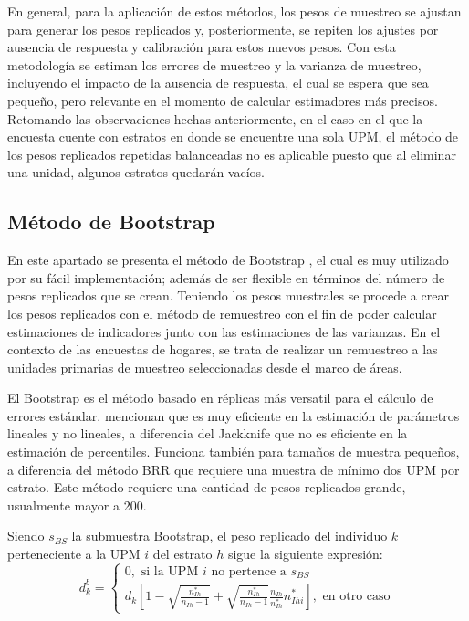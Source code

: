 \documentclass[
  12pt,
]{book}
\begin{document}
En general, para la aplicación de estos métodos, los pesos de muestreo se ajustan para generar los pesos replicados y, posteriormente, se repiten los ajustes por ausencia de respuesta y calibración para estos nuevos pesos. Con esta metodología se estiman los errores de muestreo y la varianza de muestreo, incluyendo el impacto de la ausencia de respuesta, el cual se espera que sea pequeño, pero relevante en el momento de calcular estimadores más precisos. Retomando las observaciones hechas anteriormente, en el caso en el que la encuesta cuente con estratos en donde se encuentre una sola UPM, el método de los pesos replicados repetidas balanceadas no es aplicable puesto que al eliminar una unidad, algunos estratos quedarán vacíos.

\hypertarget{muxe9todo-de-bootstrap}{%
\subsection{Método de Bootstrap}\label{muxe9todo-de-bootstrap}}

En este apartado se presenta el método de Bootstrap \citep{EfroTibs93}, el cual es muy utilizado por su fácil implementación; además de ser flexible en términos del número de pesos replicados que se crean. Teniendo los pesos muestrales se procede a crear los pesos replicados con el método de remuestreo con el fin de poder calcular estimaciones de indicadores junto con las estimaciones de las varianzas. En el contexto de las encuestas de hogares, se trata de realizar un remuestreo a las unidades primarias de muestreo seleccionadas desde el marco de áreas.

El Bootstrap es el método basado en réplicas más versatil para el cálculo de errores estándar. \citet{Valliant_Dever_2017} mencionan que es muy eficiente en la estimación de parámetros lineales y no lineales, a diferencia del Jackknife que no es eficiente en la estimación de percentiles. Funciona también para tamaños de muestra pequeños, a diferencia del método BRR que requiere una muestra de mínimo dos UPM por estrato. Este método requiere una cantidad de pesos replicados grande, usualmente mayor a 200.

Siendo \(s_{BS}\) la submuestra Bootstrap, el peso replicado del individuo \(k\) perteneciente a la UPM \(i\) del estrato \(h\) sigue la siguiente expresión:
\[
d_k^b = 
\begin{cases}
0, \text{\ si la UPM $i$ no pertence a $s_{BS}$} \\
d_k\left[1 - \sqrt{\frac{n_{Ih}^*}{n_{Ih}-1}}+\sqrt{\frac{n_{Ih}^*}{n_{Ih}-1}}
\frac{n_{Ih}}{n_{Ih}^*}n_{Ihi}^*
\right], \text{\ en otro caso} 
\end{cases}
\]
\end{document}
